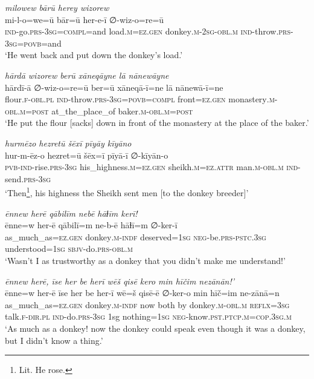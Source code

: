 \ea \label{HB.72}
\textit{milowew bārū herey wizorew} \\ 
\gll mi-l-o=we=ū bār=ū her-e-ī ∅-wiz-o=re=ū \\ 
 \textsc{ind-}go\textsc{.prs}\textsc{-3sg}\textsc{=\textsc{compl}}=and load\textsc{.m}\textsc{=ez}\textsc{.gen} donkey\textsc{.m}-\textsc{2sg}\textsc{-obl}\textsc{.m} \textsc{ind-}throw\textsc{.prs}\textsc{-3sg}\textsc{=\textsc{povb}}=and \\ 
\glt `He went back and put down the donkey’s load.'
\z 
 
\ea \label{HB.73}
\textit{hārdā wizorew berū xāneqāyne lā nānewāyne} \\ 
\gll hārdī-ā ∅-wiz-o=re=ū ber=ū xāneqā-ī=ne lā nānewā-ī=ne \\ 
 flour\textsc{\textsc{.f}}\textsc{-obl}\textsc{.pl} \textsc{ind-}throw\textsc{.prs}\textsc{-3sg}\textsc{=\textsc{povb}}=\textsc{compl} front\textsc{=ez}\textsc{.gen} monastery\textsc{.m}\textsc{-obl}\textsc{.m}\textsc{=\textsc{post}} at\_the\_place\_of baker\textsc{.m}\textsc{-obl}\textsc{.m}\textsc{=\textsc{post}} \\ 
\glt `He put the flour [sacks] down in front of the monastery at the place of the baker.'
\z 
 
\ea \label{HB.78}
\textit{hurmēzo hezretū šēxī pīyāy kīyāno} \\ 
\gll hur-m-ēz-o hezret=ū šēx=ī pīyā-ī ∅-kīyān-o \\ 
 \textsc{pvb-}\textsc{ind-}rise\textsc{.prs}\textsc{-3sg} his\_highness\textsc{.m}\textsc{=ez}\textsc{.gen} sheikh\textsc{.m}\textsc{=ez}.\textsc{attr} man\textsc{.m}\textsc{-obl}\textsc{.m} \textsc{ind-}send\textsc{.prs}\textsc{-3sg} \\ 
\glt `Then\footnote{Lit. He rose.}, his highness the Sheikh sent men [to the donkey breeder]'
\z 
 
\ea \label{HB.83}
\textit{ēnnew herē qābilīm nebē hāɫīm kerī!} \\ 
\gll ēnne=w her-ē qābilī=m ne-b-ē hāɫī=m ∅-ker-ī \\ 
 as\_much\_as\textsc{=ez}\textsc{.gen} donkey\textsc{.m}\textsc{-indf} deserved\textsc{=1sg} \textsc{neg-}be\textsc{.prs}\textsc{-pstc}\textsc{.3sg} understood\textsc{=1sg} \textsc{sbjv-}do\textsc{.prs}\textsc{-obl}\textsc{.m} \\ 
\glt `Wasn’t I as trustworthy as a donkey that you didn’t make me understand!'
\z 
 
\ea \label{HB.84}
\textit{ēnnew herē, īse her be herī wēš qisē kero min hīčim nezānān!’} \\ 
\gll ēnne=w her-ē īse her be her-ī wē=š qisē-ē ∅-ker-o min hīč=im ne-zānā=n \\ 
 as\_much\_as\textsc{=ez}\textsc{.gen} donkey\textsc{.m}\textsc{-indf} now both by donkey\textsc{.m}\textsc{-obl}\textsc{.m} \textsc{reflx}\textsc{=3sg} talk\textsc{\textsc{.f}}\textsc{-dir}\textsc{.pl} \textsc{ind-}do\textsc{.prs}\textsc{-3sg} 1sg nothing\textsc{=1sg} \textsc{neg-}know\textsc{.pst}\textsc{.ptcp}\textsc{.m}\textsc{=cop}\textsc{.3sg}\textsc{.m} \\ 
\glt `As much as a donkey! now the donkey could speak even though it was a donkey, but I didn’t know a thing.'
\z 
 
